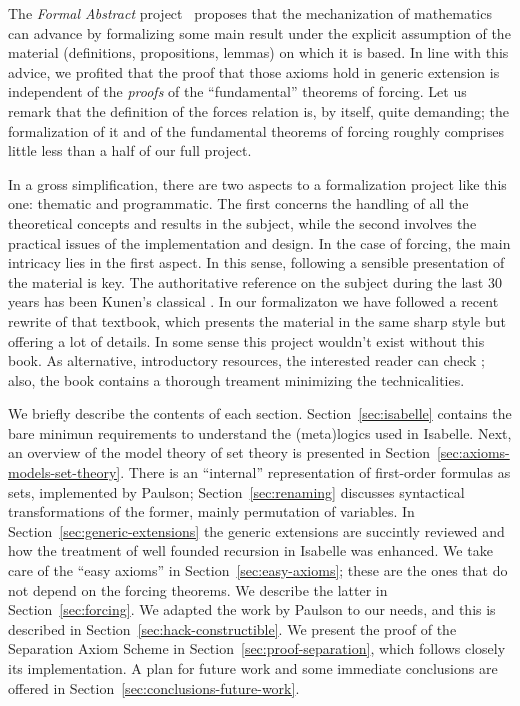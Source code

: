 The \emph{Formal Abstract} project~\cite{hales-fabstracts} proposes
that the mechanization of mathematics can advance by formalizing some
main result under the explicit assumption of the material
(definitions, propositions, lemmas) on which it is based. In line with
this advice, we profited that the proof that those axioms hold in
generic extension is independent of the \emph{proofs} of the
``fundamental'' theorems of forcing. Let us remark that the definition
of the forces relation is, by itself, quite demanding; the
formalization of it and of the fundamental theorems of forcing roughly
comprises little less than a half of our full project.


In a gross simplification, there are two aspects to a formalization
project like this one: thematic and programmatic. The first concerns
the handling of all the theoretical concepts and results in the
subject, while the second involves the practical issues of the
implementation and design. In the case of forcing, the main intricacy
lies in the first aspect. In this sense, following a sensible
presentation of the material is key.  The authoritative reference 
on the subject during the last 30 years has been Kunen's classical
\cite{kunen1980}. In our
formalizaton we have followed a recent rewrite \cite{kunen2011set}
of that  textbook, which presents the material in the same sharp 
style but offering a lot of details. In some sense this project
wouldn't exist without this book. As alternative, introductory
resources, the  interested reader can check
\cite{chow-beginner-forcing}; also, the book \cite{weaver2014forcing}
contains a thorough treament minimizing the technicalities.

We briefly describe the contents of each
section. Section~\ref{sec:isabelle} contains the bare minimun
requirements to understand the (meta)logics used in Isabelle. Next, an
overview of the model theory of set theory is presented in
Section~\ref{sec:axioms-models-set-theory}. There is an ``internal''
representation of first-order formulas as sets, implemented by
Paulson; Section~\ref{sec:renaming} discusses syntactical
transformations of the former, mainly permutation of variables. 
In Section~\ref{sec:generic-extensions} the generic extensions are
succintly reviewed and how the treatment of well founded recursion in
Isabelle was enhanced. We take care of the ``easy axioms'' in
Section~\ref{sec:easy-axioms}; these are the ones that
do not depend on the forcing theorems. We describe the latter in
Section~\ref{sec:forcing}. We adapted the  work by Paulson to our
needs, and this is described in
Section~\ref{sec:hack-constructible}. We present the proof
of the Separation Axiom Scheme in Section~\ref{sec:proof-separation},
which follows closely its implementation. A plan for future work and
some immediate conclusions are offered in
Section~\ref{sec:conclusions-future-work}.

